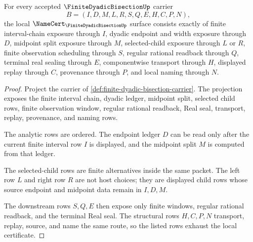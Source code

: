 \begin{theorem}
\label{thm:finite-dyadic-bisection-namecert-obligations}
For every accepted $\FiniteDyadicBisectionUp$ carrier
$$
B=(I,D,M,L,R,S,Q,E,H,C,P,N),
$$
the local $\NameCert_{\FiniteDyadicBisectionUp}$ surface consists exactly of finite interval-chain exposure through $I$, dyadic endpoint and width exposure through $D$, midpoint split exposure through $M$, selected-child exposure through $L$ or $R$, finite observation scheduling through $S$, regular rational readback through $Q$, terminal real sealing through $E$, componentwise transport through $H$, displayed replay through $C$, provenance through $P$, and local naming through $N$.
\end{theorem}
\begin{proof}
Project the carrier of \autoref{def:finite-dyadic-bisection-carrier}. The projection exposes the finite interval chain, dyadic ledger, midpoint split, selected child rows, finite observation window, regular rational readback, Real seal, transport, replay, provenance, and naming rows.

The analytic rows are ordered. The endpoint ledger $D$ can be read only after the current finite interval row $I$ is displayed, and the midpoint split $M$ is computed from that ledger.

The selected-child rows are finite alternatives inside the same packet. The left row $L$ and right row $R$ are not host choices; they are displayed child rows whose source endpoint and midpoint data remain in $I,D,M$.

The downstream rows $S,Q,E$ then expose only finite windows, regular rational readback, and the terminal Real seal. The structural rows $H,C,P,N$ transport, replay, source, and name the same route, so the listed rows exhaust the local certificate.
\end{proof}

